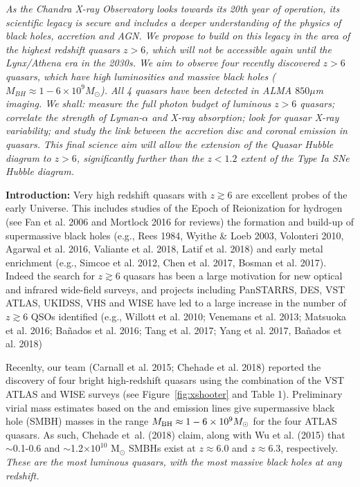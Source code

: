 

\noindent
{\it As the Chandra X-ray Observatory looks towards its 20th year of
operation, its scientific legacy is secure and includes a deeper
understanding of the physics of black holes, accretion and AGN.  We
propose to build on this legacy in the area of the highest redshift
quasars $z > 6$, which will not be accessible again until the
Lynx/Athena era in the 2030s. We aim to observe four recently
discovered $z > 6$ quasars, which have high luminosities and massive
black holes ($M_{BH}\approx1-6\times10^9M_\odot$). All 4 quasars have
been detected in ALMA $850\mu$m imaging. We shall: measure the full
photon budget of luminous $z > 6$ quasars; correlate the strength of
Lyman-$\alpha$ and X-ray absorption; look for quasar X-ray
variability; and study the link between the accretion disc and coronal
emission in quasars. This final science aim will allow the extension
of the Quasar Hubble diagram to $z > 6$, significantly further than the
$z<1.2$ extent of the Type Ia SNe Hubble diagram.}

\smallskip
\smallskip
\noindent
{\bf Introduction:} Very high redshift quasars with $z\gtrsim6$ are
excellent probes of the early Universe. This includes studies of the
Epoch of Reionization for hydrogen (see Fan et al. 2006 and Mortlock
2016 for reviews) the formation and build-up of supermassive black
holes (e.g., Rees 1984, Wyithe \& Loeb 2003, Volonteri 2010, Agarwal et
al. 2016, Valiante et al. 2018, Latif et al. 2018) and early metal
enrichment (e.g., Simcoe et al. 2012, Chen et al. 2017, Bosman et
al. 2017). Indeed the search for $z\gtrsim6$ quasars has been a large
motivation for new optical and infrared wide-field surveys, and
projects including PanSTARRS, DES, VST ATLAS, UKIDSS, VHS and WISE
have led to a large increase in the number of $z\gtrsim6$ QSOs
identified (e.g., Willott et al. 2010; Venemans et al. 2013; Matsuoka
et al. 2016; Ba\~{n}ados et al. 2016; Tang et al. 2017; Yang et
al. 2017, Ba\~{n}ados et al. 2018)

\smallskip
\smallskip
\noindent
Recenlty, our team (Carnall et al. 2015; Chehade et al. 2018) reported
the discovery of four bright high-redshift quasars using the
combination of the VST ATLAS and WISE surveys (see
Figure~\ref{fig:xshooter} and Table 1).  Preliminary virial mass
estimates based on the \civ and \mgii emission lines give supermassive
black hole (SMBH) masses in the range $M_{\rm BH} \approx 1 - 6\times
10^{9} M_{\odot}$ for the four ATLAS quasars.  As such, Chehade
et~al. (2018) claim, along with Wu et al. (2015) that $\sim$0.1-0.6
and $\sim$1.2$\times 10^{10}$ M$_{\odot}$ SMBHs exist at $z\approx6.0$
and $z\approx6.3$, respectively. {\it These are the most luminous
quasars, with the most massive black holes at any redshift.}


